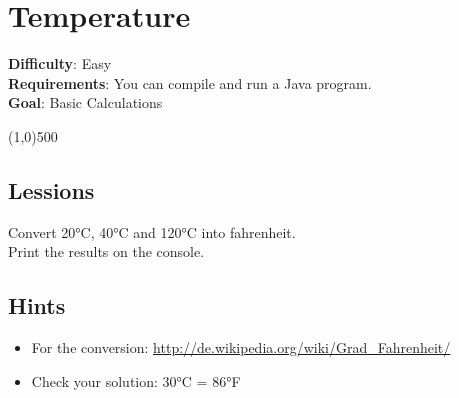 


\chapter*{Temperature}

\headingfont
\parbox {\textwidth}{
    \textbf{Difficulty}: Easy \\
    \textbf{Requirements}: You can compile and run a Java program. \\
    \textbf{Goal}: Basic Calculations
}
\normalfont
\begin{center}
\line(1,0){500}
\end{center}
\vspace{1cm}

\section*{Lessions}
Convert 20°C, 40°C and 120°C into fahrenheit. \\
Print the results on the console.

\section*{Hints}
\begin{itemize}
     \item For the conversion: 
         \url{http://de.wikipedia.org/wiki/Grad_Fahrenheit/}
     \item Check your solution: 30°C = 86°F
\end{itemize}

